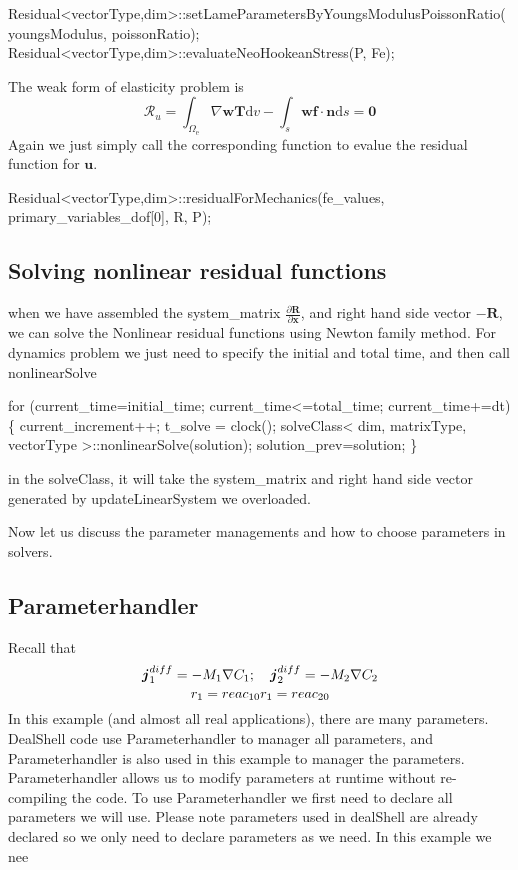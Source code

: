 \begin{DoxyCode}
Residual<vectorType,dim>::setLameParametersByYoungsModulusPoissonRatio(youngsModulus, poissonRatio);
Residual<vectorType,dim>::evaluateNeoHookeanStress(P, Fe);
\end{DoxyCode}
 The weak form of elasticity problem is \[ \mathscr{R}_u=\int_{\Omega_{\text{e}}}\nabla \boldsymbol{w}\boldsymbol{T} \text{d}v- \int_{s}\boldsymbol{w} \boldsymbol{f} \cdot \boldsymbol{n} \text{d}s = \boldsymbol{0} \] Again we just simply call the corresponding function to evalue the residual function for $\boldsymbol{u}$. 
\begin{DoxyCode}
Residual<vectorType,dim>::residualForMechanics(fe\_values, primary\_variables\_dof[0], R, P);
\end{DoxyCode}
\hypertarget{brain_morph_solve}{}\subsection{Solving nonlinear residual functions}\label{brain_morph_solve}
when we have assembled the system\-\_\-matrix $\frac{\partial \boldsymbol{R}}{\partial \boldsymbol{x}} $, and right hand side vector $-\boldsymbol{R}$, we can solve the Nonlinear residual functions using Newton family method. For dynamics problem we just need to specify the initial and total time, and then call {\ttfamily nonlinear\-Solve} 
\begin{DoxyCode}
 \textcolor{keywordflow}{for} (current\_time=initial\_time; current\_time<=total\_time; current\_time+=dt)\{
   current\_increment++;
   t\_solve = clock();
       solveClass< dim, matrixType, vectorType >::nonlinearSolve(solution);
       solution\_prev=solution;
\}
\end{DoxyCode}
 in the {\ttfamily solve\-Class}, it will take the system\-\_\-matrix and right hand side vector generated by {\ttfamily update\-Linear\-System} we overloaded.\par
 \par
 Now let us discuss the parameter managements and how to choose parameters in solvers. \hypertarget{brain_morph_parameter}{}\subsection{Parameterhandler}\label{brain_morph_parameter}
Recall that \[ \boldsymbol{j}_1^{diff}=-M_1\nabla C_\text{1}; \quad \boldsymbol{j}_2^{diff}=-M_2\nabla C_\text{2}\\ \] \[ r_1= reac_{10} \\ r_1= reac_{20} \] In this example (and almost all real applications), there are many parameters. Deal\-Shell code use {\ttfamily Parameterhandler} to manager all parameters, and {\ttfamily Parameterhandler} is also used in this example to manager the parameters. {\ttfamily Parameterhandler} allows us to modify parameters at runtime without re-\/compiling the code. To use {\ttfamily Parameterhandler} we first need to declare all parameters we will use. Please note parameters used in deal\-Shell are already declared so we only need to declare parameters as we need. In this example we nee 

